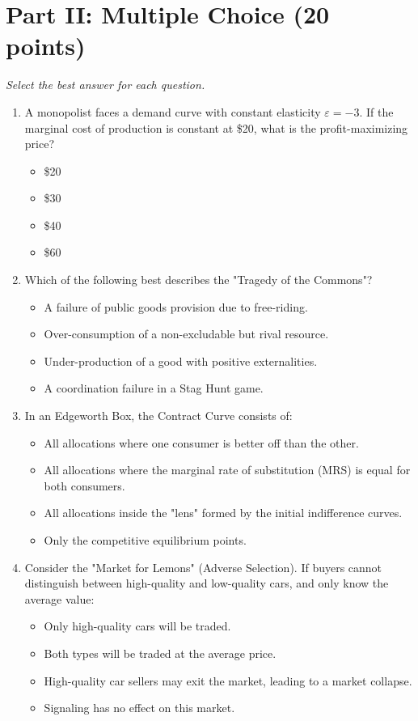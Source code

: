 \documentclass[12pt]{article}
\begin{document}
\section*{Part II: Multiple Choice (20 points)}
\textit{Select the best answer for each question.}

\begin{enumerate}
    \item A monopolist faces a demand curve with constant elasticity $\varepsilon = -3$. If the marginal cost of production is constant at \$20, what is the profit-maximizing price?
    \begin{itemize}
        \item[A.] \$20
        \item[B.] \$30
        \item[C.] \$40
        \item[D.] \$60
    \end{itemize}

    \item Which of the following best describes the "Tragedy of the Commons"?
    \begin{itemize}
        \item[A.] A failure of public goods provision due to free-riding.
        \item[B.] Over-consumption of a non-excludable but rival resource.
        \item[C.] Under-production of a good with positive externalities.
        \item[D.] A coordination failure in a Stag Hunt game.
    \end{itemize}

    \item In an Edgeworth Box, the Contract Curve consists of:
    \begin{itemize}
        \item[A.] All allocations where one consumer is better off than the other.
        \item[B.] All allocations where the marginal rate of substitution (MRS) is equal for both consumers.
        \item[C.] All allocations inside the "lens" formed by the initial indifference curves.
        \item[D.] Only the competitive equilibrium points.
    \end{itemize}

    \item Consider the "Market for Lemons" (Adverse Selection). If buyers cannot distinguish between high-quality and low-quality cars, and only know the average value:
    \begin{itemize}
        \item[A.] Only high-quality cars will be traded.
        \item[B.] Both types will be traded at the average price.
        \item[C.] High-quality car sellers may exit the market, leading to a market collapse.
        \item[D.] Signaling has no effect on this market.
    \end{itemize}


\end{enumerate}
\end{document}
